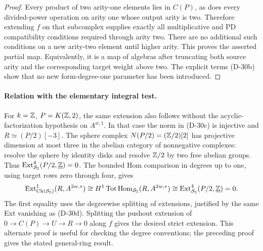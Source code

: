 \begin{proof}
Every product of two arity-one elements lies in
\(C(P)\), as does every divided-power operation on
arity one whose output arity is two. Therefore
extending \(f\) on that subcomplex supplies exactly
all multiplicative and PD compatibility conditions
required through arity two. There are no additional
such conditions on a new arity-two element until
higher arity. This proves the asserted partial map.
Equivalently, it is a map of algebras after truncating
both source arity and the corresponding target weight
above two. The explicit terms (D-30b) show that no new
form-degree-one parameter has been introduced.
\end{proof}

\paragraph{Relation with the elementary integral test.}
For \(k=\mathbb Z\), \(P=K(\mathbb Z,2)\), the same extension also
follows without the acyclic-factorization hypothesis
on \(A^{w,1}\). In that case the norm in (D-30c) is
injective and \(R\simeq(P/2)[-3]\).
The sphere complex \(N(P/2)=(\mathbb Z/2)[2]\) has projective
dimension at most three in the abelian category of
nonnegative complexes: resolve the sphere by identity
disks and resolve \(\mathbb Z/2\) by two free abelian groups.
Thus \(\operatorname{Ext}^4_{\mathcal S_{\mathbb Z}}
(P/2,\underline{\mathbb Z})=0\).
The bounded Hom comparison in degrees up to one,
using target rows zero through four, gives
\[
 \operatorname{Ext}^1_{\operatorname{Ch}(\mathcal S_{\mathbb Z})}
       (R,A^{2w,*})
 \cong H^1\operatorname{Tot}\operatorname{Hom}_{\mathcal S_{\mathbb Z}}
       (R,A^{2w,*})
 \cong\operatorname{Ext}^4_{\mathcal S_{\mathbb Z}}
       (P/2,\underline{\mathbb Z})=0.
\]
The first equality uses the degreewise splitting of
extensions, justified by the same Ext vanishing as
(D-30d). Splitting the pushout extension of
\(0\to C(P)\to U\to R\to0\) along \(f\) gives
the desired strict extension. This alternate proof
is useful for checking the degree conventions;
the preceding proof gives the stated general-ring result.
